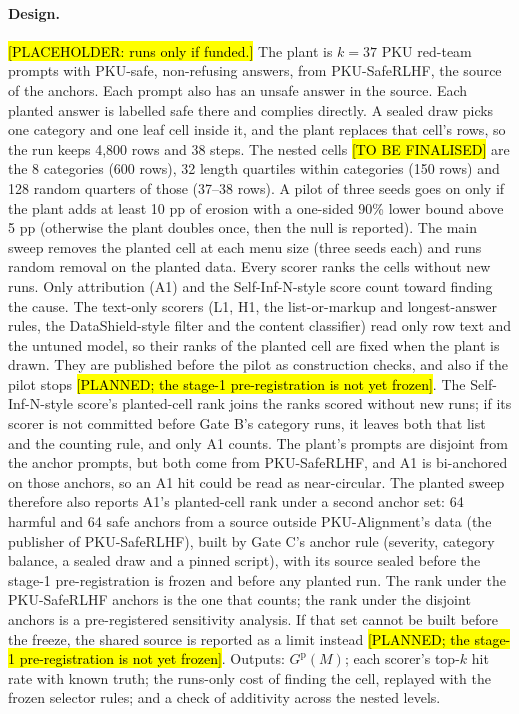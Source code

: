 \documentclass{article}
\theoremstyle{plain}
\theoremstyle{definition}
\theoremstyle{remark}
\newcommand{\ph}[1]{\hl{#1}}
\begin{document}
\paragraph{Design.}
\ph{[PLACEHOLDER: runs only if funded.]} The plant is $k = 37$ PKU red-team prompts with PKU-safe, non-refusing
answers, from PKU-SafeRLHF, the source of the anchors. Each prompt also has an
unsafe answer in the source. Each planted answer is labelled safe there and
complies directly. A sealed draw
picks one category and one leaf cell inside it, and the plant replaces that
cell's rows, so the run keeps 4,800 rows and 38 steps. The nested cells
\ph{[TO BE FINALISED]} are the 8 categories (600 rows), 32 length quartiles
within categories (150 rows) and 128 random quarters of those (37--38 rows). A
pilot of three seeds goes on only if the plant adds at least 10 pp of erosion
with a one-sided 90\% lower bound above 5 pp (otherwise the plant doubles once,
then the null is reported). The main sweep removes the planted cell at each
menu size (three seeds each) and runs random removal on the planted data.
Every scorer ranks the cells without new runs. Only attribution (A1) and the
Self-Inf-N-style score count toward finding the cause. The text-only scorers
(L1, H1, the list-or-markup and longest-answer rules, the DataShield-style
filter and the content classifier) read only row text and the untuned model,
so their ranks of the planted cell are fixed when the plant is drawn. They are
published before the pilot as construction checks, and also if the pilot stops \ph{[PLANNED; the stage-1 pre-registration is not
yet frozen]}. The Self-Inf-N-style score's planted-cell rank joins the ranks
scored without new runs; if its scorer is not committed before Gate B's
category runs, it leaves both that list and the counting rule, and only A1
counts. The plant's prompts are disjoint from the anchor prompts, but both
come from PKU-SafeRLHF, and A1 is bi-anchored on those anchors, so an A1 hit
could be read as near-circular. The planted sweep therefore also reports A1's
planted-cell rank under a second anchor set: 64 harmful and 64 safe anchors
from a source outside PKU-Alignment's data (the publisher of PKU-SafeRLHF),
built by Gate C's anchor rule (severity, category balance, a sealed draw and a
pinned script), with its source sealed before the stage-1 pre-registration is
frozen and before any planted run. The rank under the PKU-SafeRLHF anchors is
the one that counts; the rank under the disjoint anchors is a pre-registered
sensitivity analysis. If that set cannot be built before the freeze, the
shared source is reported as a limit instead \ph{[PLANNED; the stage-1
pre-registration is not yet frozen]}. Outputs:
$G^{\mathrm{p}}(M)$; each scorer's top-$k$ hit rate with known truth; the runs-only cost of
finding the cell, replayed with the frozen selector rules; and a check of
additivity across the nested levels.
\end{document}
